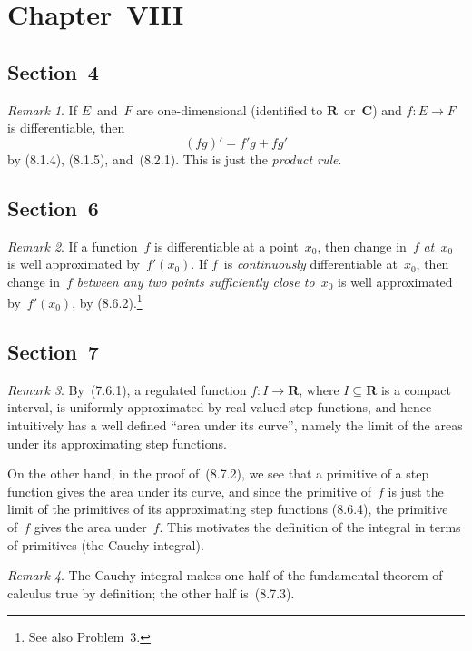 \documentclass[letterpaper,12pt]{article}
\newcommand{\R}{\mathbf{R}}
\newcommand{\C}{\mathbf{C}}
\theoremstyle{plain}
\theoremstyle{definition}
\theoremstyle{remark}
\newtheorem*{rmk}{Remark}
\begin{document}
\section*{Chapter~VIII}
\subsection*{Section~4}
\begin{rmk}
If \(E\)~and~\(F\) are one-dimensional (identified to \(\R\)~or~\(\C\)) and \(f:E\to F\) is differentiable, then
\[(fg)'=f'g+fg'\]
by (8.1.4), (8.1.5), and~(8.2.1). This is just the \emph{product rule}.
\end{rmk}

\subsection*{Section~6}
\begin{rmk}
If a function~\(f\) is differentiable at a point~\(x_0\), then change in~\(f\) \emph{at~\(x_0\)} is well approximated by~\(f'(x_0)\). If \(f\)~is \emph{continuously} differentiable at~\(x_0\), then change in~\(f\) \emph{between any two points sufficiently close to~\(x_0\)} is well approximated by~\(f'(x_0)\), by (8.6.2).\footnote{See also Problem~3.}
\end{rmk}

\subsection*{Section~7}
\begin{rmk}
By~(7.6.1), a regulated function \(f:I\to\R\), where \(I\subseteq\R\) is a compact interval, is uniformly approximated by real-valued step functions, and hence intuitively has a well defined ``area under its curve'', namely the limit of the areas under its approximating step functions.

On the other hand, in the proof of~(8.7.2), we see that a primitive of a step function gives the area under its curve, and since the primitive of~\(f\) is just the limit of the primitives of its approximating step functions (8.6.4), the primitive of~\(f\) gives the area under~\(f\). This motivates the definition of the integral in terms of primitives (the Cauchy integral).
\end{rmk}

\begin{rmk}
The Cauchy integral makes one half of the fundamental theorem of calculus true by definition; the other half is~(8.7.3).
\end{rmk}
\end{document}

